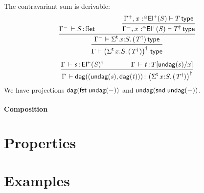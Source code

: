\documentclass[11pt]{article}
\theoremstyle{plain}
\begin{document}
The contravariant sum is derivable:
\begin{equation}
	\infer{
		\wftp{ \Gamma }{ \paren{\sigmatp{x}{S}{(T^\dagger)}}^\dagger }
	}{
		\infer{
			\wftp{ \Gamma^- }{ \sigmatp{x}{S}{(T^\dagger)} }
		}{
			\ofdtp{ \Gamma^- }{ S }{ \types }
			\qquad \qquad
			\infer{
				\wftp{\Gamma^-, \tpvar{x}{\coc}{\Elp S}}{T^\dagger}
			}{
				\wftp{\Gamma^+, \tpvar{x}{\conc}{\Elp S}}{T}
			}
		}	
	}
\end{equation}
\begin{equation}
	\infer{
		\oftp{\Gamma}{\dagtm{(\undag s, \dagtm t)}}{ \paren{\sigmatp{x}{S}{(T^\dagger)}}^\dagger }
	}{
		\oftp{\Gamma}{s}{\Elp S^\dagger}
		\qquad \qquad
		\oftp{\Gamma}{t}{\subst T {\undag s} x}
	}
\end{equation}
We have projections $\mathsf{dag}(\mathit{\mathsf{fst}_{} \: \mathsf{undag}(-)})$ and $\mathsf{undag}(\mathit{\mathsf{snd}_{} \: \mathsf{undag}(-)})$.

\paragraph{Composition}




\section{Properties}

\section{Examples}



\end{document}
